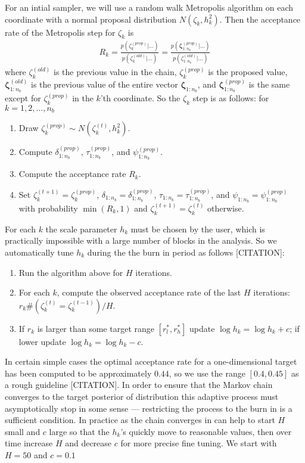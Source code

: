 \documentclass{article}
\begin{document}
For an intial sampler, we will use a random walk Metropolis algorithm on each coordinate with a normal proposal distribution $N(\zeta_k, h_k^2)$. Then the acceptance rate of the Metropolis step for $\zeta_k$ is
\begin{align*}
R_k = \frac{p(\zeta_k^{(prop)}|\dots)}{p(\zeta_k^{(old)}|\dots)} = \frac{p(\bm{\zeta}_{1:n_b}^{(prop)}|\dots)}{p(\zeta_{1:n_b}^{(old)}|\dots)}
\end{align*}
where $\zeta_k^{(old)}$ is the previous value in the chain, $\zeta_k^{(prop)}$ is the proposed value, $\bm{\zeta}_{1:n_b}^{(old)}$ is the previous value of the entire vector $\bm{\zeta}_{1:n_b}$, and $\bm{\zeta}_{1:n_b}^{(prop)}$ is the same except for $\zeta_k^{(prop)}$ in the $k$'th coordinate. So the $\zeta_k$ step is as follows: for $k=1,2,\dots,n_b$
\begin{enumerate}
\item Draw $\zeta_k^{(prop)} \sim N(\zeta_k^{(t)},h_k^2)$.
\item Compute $\delta_{1:n_b}^{(prop)}$, $\tau_{1:n_b}^{(prop)}$, and $\psi_{1:n_b}^{(prop)}$.
\item Compute the acceptance rate $R_k$.
\item Set $\zeta_k^{(t+1)} = \zeta_k^{(prop)}$, $\delta_{1:n_b} = \delta_{1:n_b}^{(prop)}$, $\tau_{1:n_b} = \tau_{1:n_b}^{(prop)}$, and $\psi_{1:n_b} = \psi_{1:n_b}^{(prop)}$ with probability $\min(R_k, 1)$ and $\zeta_k^{(t+1)} = \zeta_k^{(t)}$ otherwise. 
\end{enumerate}
For each $k$ the scale parameter $h_k$ must be chosen by the user, which is practically impossible with a large number of blocks in the analysis. So we automatically tune $h_k$ during the the burn in period as follows [CITATION]:
\begin{enumerate}
\item Run the algorithm above for $H$ iterations.
\item For each $k$, compute the observed acceptance rate of the last $H$ iterations: $r_k\#(\zeta_k^{(t)} = \zeta_k^{(t-1)})/H$.
\item If $r_k$ is larger than some target range $[r_l^*, r_h^*]$ update $\log h_k = \log h_k + c$; if lower update $\log h_k = \log h_k - c$.
\end{enumerate}
In certain simple cases the optimal acceptance rate for a one-dimensional target has been computed to be approximately $0.44$, so we use the range $[0.4, 0.45]$ as a rough guideline [CITATION]. In order to ensure that the Markov chain converges to the target posterior of distribution this adaptive process must asymptotically stop in some sense --- restricting the process to the burn in is a sufficient condition. In practice as the chain converges in can help to start $H$ small and $c$ large so that the $h_k$'s quickly move to reasonable values, then over time increase $H$ and decrease $c$ for more precise fine tuning. We start with $H=50$ and $c=0.1$
\end{document}
